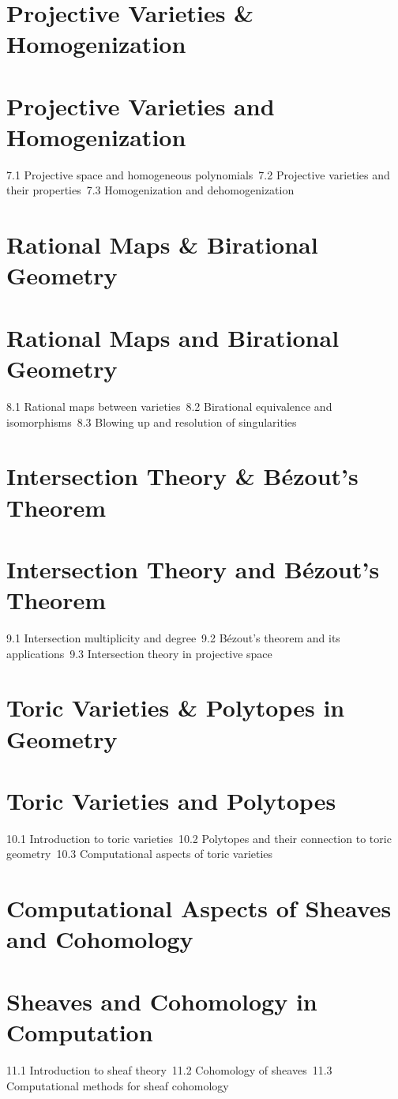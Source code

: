 \section{Projective Varieties \& Homogenization}
\section{Projective Varieties and Homogenization}
7.1 Projective space and homogeneous polynomials\
7.2 Projective varieties and their properties\
7.3 Homogenization and dehomogenization\
\section{Rational Maps \& Birational Geometry}
\section{Rational Maps and Birational Geometry}
8.1 Rational maps between varieties\
8.2 Birational equivalence and isomorphisms\
8.3 Blowing up and resolution of singularities\
\section{Intersection Theory \& Bézout's Theorem}
\section{Intersection Theory and Bézout's Theorem}
9.1 Intersection multiplicity and degree\
9.2 Bézout's theorem and its applications\
9.3 Intersection theory in projective space\
\section{Toric Varieties \& Polytopes in Geometry}
\section{Toric Varieties and Polytopes}
10.1 Introduction to toric varieties\
10.2 Polytopes and their connection to toric geometry\
10.3 Computational aspects of toric varieties\
\section{Computational Aspects of Sheaves and Cohomology}
\section{Sheaves and Cohomology in Computation}
11.1 Introduction to sheaf theory\
11.2 Cohomology of sheaves\
11.3 Computational methods for sheaf cohomology\
